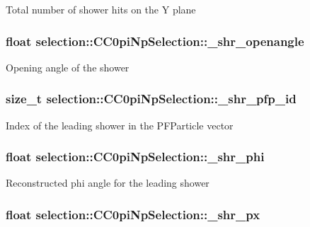 Total number of shower hits on the Y plane \hypertarget{classselection_1_1CC0piNpSelection_a33b26acb3cdb05cb1b81800d8af48a03}{
\subsubsection[{\-\_\-shr\-\_\-openangle}]{\setlength{\rightskip}{0pt plus 5cm}float selection\-::\-C\-C0pi\-Np\-Selection\-::\-\_\-shr\-\_\-openangle\hspace{0.3cm}{\ttfamily [private]}}}\label{classselection_1_1CC0piNpSelection_a33b26acb3cdb05cb1b81800d8af48a03}
Opening angle of the shower \hypertarget{classselection_1_1CC0piNpSelection_a21f98860ef8bd0ad8d8e029a47ef6f1e}{
\subsubsection[{\-\_\-shr\-\_\-pfp\-\_\-id}]{\setlength{\rightskip}{0pt plus 5cm}size\-\_\-t selection\-::\-C\-C0pi\-Np\-Selection\-::\-\_\-shr\-\_\-pfp\-\_\-id\hspace{0.3cm}{\ttfamily [private]}}}\label{classselection_1_1CC0piNpSelection_a21f98860ef8bd0ad8d8e029a47ef6f1e}
Index of the leading shower in the P\-F\-Particle vector \hypertarget{classselection_1_1CC0piNpSelection_a8706a83b3dc2e2c3857ada556392f16f}{
\subsubsection[{\-\_\-shr\-\_\-phi}]{\setlength{\rightskip}{0pt plus 5cm}float selection\-::\-C\-C0pi\-Np\-Selection\-::\-\_\-shr\-\_\-phi\hspace{0.3cm}{\ttfamily [private]}}}\label{classselection_1_1CC0piNpSelection_a8706a83b3dc2e2c3857ada556392f16f}
Reconstructed phi angle for the leading shower \hypertarget{classselection_1_1CC0piNpSelection_a52e2043c82f5de7f93ac9bad63563f18}{
\subsubsection[{\-\_\-shr\-\_\-px}]{\setlength{\rightskip}{0pt plus 5cm}float selection\-::\-C\-C0pi\-Np\-Selection\-::\-\_\-shr\-\_\-px\hspace{0.3cm}{\ttfamily [private]}}}\label{classselection_1_1CC0piNpSelection_a52e2043c82f5de7f93ac9bad63563f18}
